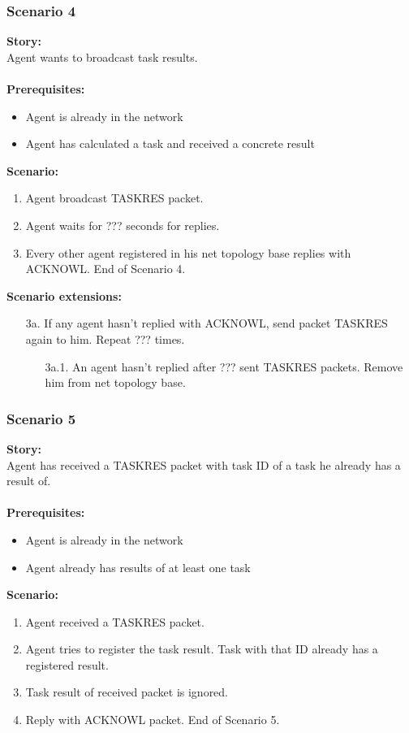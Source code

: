 \documentclass{article}
\begin{document}
\subsubsection{Scenario 4}
\noindent\textbf{Story:} \\
Agent wants to broadcast task results. \\\\
\textbf{Prerequisites:}
\begin{itemize}
    \item Agent is already in the network
    \item Agent has calculated a task and received a concrete result
\end{itemize}
\textbf{Scenario:}
\begin{enumerate}
    \item Agent broadcast TASKRES packet.
    \item Agent waits for ??? seconds for replies.
    \item Every other agent registered in his net topology base replies with ACKNOWL. End of Scenario 4.
\end{enumerate}
\textbf{Scenario extensions:}
\begin{itemize}
    \item[3a.] If any agent hasn't replied with ACKNOWL, send packet TASKRES again to him. Repeat ??? times. 
    \begin{itemize}
        \item[3a.1.] An agent hasn't replied after ??? sent TASKRES packets. Remove him from net topology base.
    \end{itemize} 
\end{itemize}

\subsubsection{Scenario 5}
\noindent\textbf{Story:} \\
Agent has received a TASKRES packet with task ID of a task he already has a result of. \\\\
\textbf{Prerequisites:}
\begin{itemize}
    \item Agent is already in the network
    \item Agent already has results of at least one task
\end{itemize}
\textbf{Scenario:}
\begin{enumerate}
    \item Agent received a TASKRES packet.
    \item Agent tries to register the task result. Task with that ID already has a registered result.
    \item Task result of received packet is ignored. 
    \item Reply with ACKNOWL packet. End of Scenario 5.
\end{enumerate}
\end{document}
